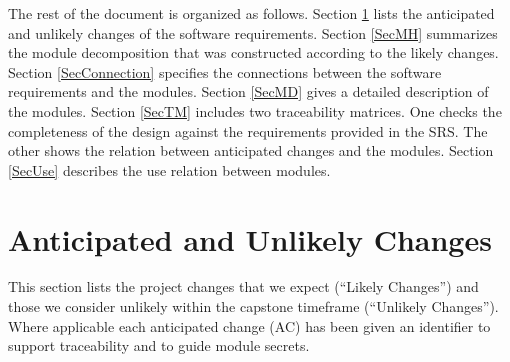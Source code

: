 \documentclass[12pt, titlepage]{article}
\begin{document}
The rest of the document is organized as follows. Section
\ref{SecChange} lists the anticipated and unlikely changes of the software
requirements. Section \ref{SecMH} summarizes the module decomposition that
was constructed according to the likely changes. Section \ref{SecConnection}
specifies the connections between the software requirements and the
modules. Section \ref{SecMD} gives a detailed description of the
modules. Section \ref{SecTM} includes two traceability matrices. One checks
the completeness of the design against the requirements provided in the SRS. The
other shows the relation between anticipated changes and the modules. Section
\ref{SecUse} describes the use relation between modules.


\section{Anticipated and Unlikely Changes} \label{SecChange}

This section lists the project changes that we expect (``Likely Changes'') and those we consider unlikely within the capstone timeframe (``Unlikely Changes'').  Where applicable each anticipated change (AC) has been given an identifier to support traceability and to guide module secrets.
\end{document}
